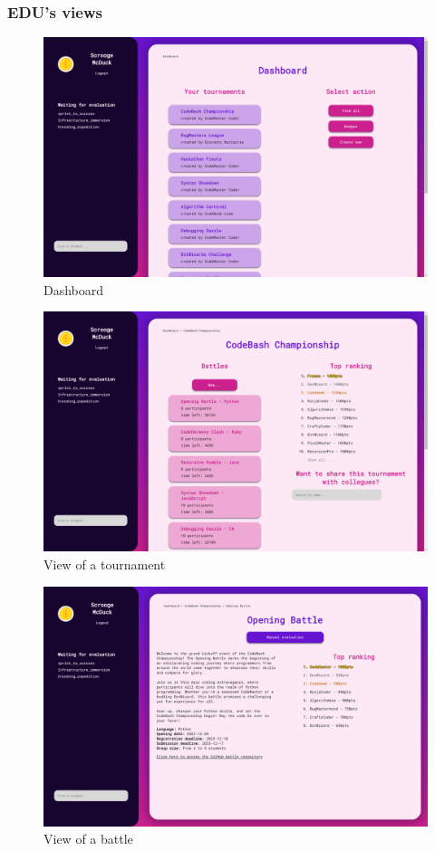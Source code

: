 \subsubsection*{EDU's views}
\begin{figure}[H]
    \centering
    \includegraphics[width=.9\textwidth]{images/user_interfaces/educator_dashboard.png}
    \caption{Dashboard}
\end{figure}
\begin{figure}[H]
    \centering
    \includegraphics[width=.9\textwidth]{images/user_interfaces/educator_tournament_view.png}
    \caption{View of a tournament}
\end{figure}
\begin{figure}[H]
    \centering
    \includegraphics[width=.9\textwidth]{images/user_interfaces/educator_battle_view.png}
    \caption{View of a battle}
\end{figure}
